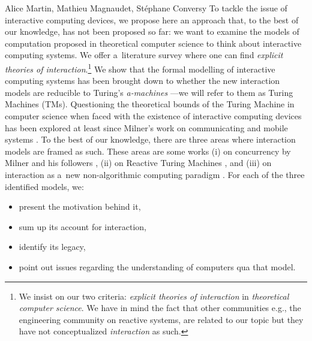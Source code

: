 \begin{artengenv2auth}{Alice Martin, Mathieu Magnaudet, Stéphane Conversy}
To tackle the issue of interactive computing devices, we propose here an approach that, to the best of our knowledge, has not been proposed so far: we want to examine the models of computation proposed in theoretical computer science to think about interactive computing systems. We offer a~literature survey where one can find \textit{explicit theories of interaction}.\footnote{We insist on our two criteria: \textit{explicit theories of interaction} in \textit{theoretical computer science}. We have in mind the fact that other communities e.g., the engineering community on reactive systems, are related to our topic but they have not conceptualized \textit{interaction} as such.} We show that the formal modelling of interactive computing systems has been brought down to whether the new interaction models are reducible to Turing’s \emph{a-machines} \parencite{Turing1937}---we will refer to them as Turing Machines (TMs). 
Questioning the theoretical bounds of the Turing Machine in computer science when faced with the existence of interactive computing devices has been explored at least since Milner's work on communicating and mobile systems \parencite{Milner1993, Milner1999}. To the best of our knowledge, there are three areas where interaction models are framed as such. These areas are some works (i) on concurrency by Milner and his followers \parencite{Milner1999, Milner2006}, (ii) on Reactive Turing Machines \parencite{Andersen1997, Baeten2013, VanLeeuwen2001, VanLeeuwen2006}, and (iii) on interaction as a~new non-algorithmic computing paradigm \parencite{Goldin2006, Wegner1997, Wegner2003}. For each of the three identified models, we:

\begin{itemize}
    \item present the motivation behind it, 
    \item sum up its account for interaction,
    \item identify its legacy,
    \item point out issues regarding the understanding of computers qua that model.
\end{itemize}


\end{artengenv2auth}
